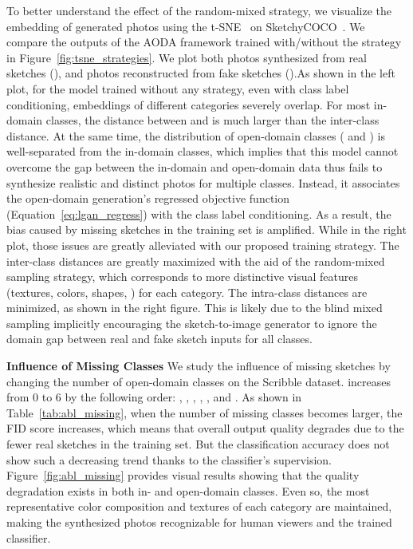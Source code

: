 \documentclass[10pt,twocolumn,letterpaper]{article}
\begin{document}
To better understand the effect of the random-mixed strategy, we visualize the embedding of generated photos using the t-SNE~\cite{tsne2008laurens} on SketchyCOCO~\cite{gao2020sketchycoco}. We compare the outputs of the AODA framework trained with/without the strategy in Figure~\ref{fig:tsne_strategies}. We plot both photos  synthesized from real sketches (), and photos  reconstructed from fake sketches ().As shown in the left plot, for the model trained without any strategy, even with class label conditioning, embeddings of different categories severely overlap. For most in-domain classes, the distance between  and  is much larger than the inter-class distance. At the same time, the distribution of open-domain classes (\textcolor{violet}{} and \textcolor{green}{}) is well-separated from the in-domain classes, which implies that this model cannot overcome the gap between the in-domain and open-domain data thus fails to synthesize realistic and distinct photos for multiple classes. Instead, it associates the open-domain generation's regressed objective function (Equation~\ref{eq:lgan_regress}) with the class label conditioning. As a result, the bias caused by missing sketches in the training set is amplified. While in the right plot, those issues are greatly alleviated with our proposed training strategy. The inter-class distances are greatly maximized with the aid of the random-mixed sampling strategy, which corresponds to more distinctive visual features (textures, colors, shapes, \etc) for each category. The intra-class distances are minimized, as shown in the right figure. This is likely due to the blind mixed sampling implicitly encouraging the sketch-to-image generator to ignore the domain gap between real and fake sketch inputs for all classes.







\noindent \textbf{Influence of Missing Classes} We study the influence of missing sketches by changing the number of open-domain classes  on the Scribble dataset.  increases from 0 to 6 by the following order: , , , , , and . As shown in Table~\ref{tab:abl_missing}, when the number of missing classes becomes larger, the FID score increases, which means that overall output quality degrades due to the fewer real sketches in the training set. But the classification accuracy does not show such a decreasing trend thanks to the classifier's supervision. Figure~\ref{fig:abl_missing} provides visual results showing that the quality degradation exists in both in- and open-domain classes. Even so, the most representative color composition and textures of each category are maintained, making the synthesized photos recognizable for human viewers and the trained classifier.
\end{document}
